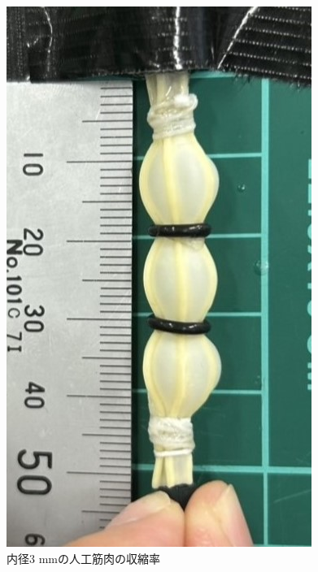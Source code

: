 \begin{figure}[h]
\begin{minipage}{0.49\columnwidth}
    \end{minipage}
    \begin{minipage}{0.49\columnwidth}
      \vspace{4mm}
      \centering
      \includegraphics[scale=0.3]{pic/L.jpg}
      
    \end{minipage}
    \caption{内径3 mmの人工筋肉の収縮率}
    \label{fig:zA}
  \end{figure}

